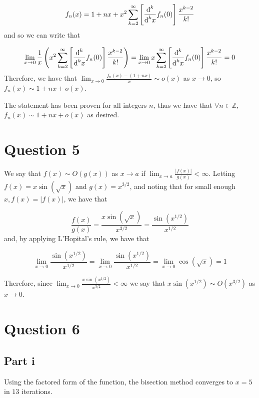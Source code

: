 \documentclass[12pt]{exam}
\newcommand{\diffd}{\textnormal{d}}
\begin{document}
\begin{equation}
f_n(x) = 1+nx+x^2\sum_{k=2}^{\infty} \left[\frac{\diffd^k}{\diffd^k x}f_n(0)\right] \frac{x^{k-2}}{k!}
\end{equation}
and so we can write that 

\begin{equation}
\lim_{x\rightarrow 0}\frac{1}{x} \left(x^2\sum_{k=2}^{\infty} \left[\frac{\diffd^k}{\diffd^k x}f_n(0)\right] \frac{x^{k-2}}{k!}\right) =
  \lim_{x\rightarrow 0} x\sum_{k=2}^{\infty} \left[\frac{\diffd^k}{\diffd^k x}f_n(0)\right] \frac{x^{k-2}}{k!}=0 
\end{equation}
Therefore, we have that $\lim_{x\rightarrow 0} \frac{f_n(x)-(1+nx)}{x}\sim o(x)$ as $x\rightarrow 0$, so $f_n(x) \sim 1+nx+o(x)$.

The statement has been proven for all integers $n$, thus we have that $\forall n \in \mathbb{Z}$, $f_n(x) \sim 1+nx+o(x)$ as desired.
\newpage 

\section*{Question 5}

We say that $f(x) \sim O( g(x) )$ as $x\rightarrow a$  if $\lim_{x\rightarrow a}\frac{|f(x)|}{g(x)} < \infty$. Letting $f(x)=x\sin(\sqrt{x})$ and $g(x) = x^{3/2}$, and noting that for small enough $x, f(x) = |f(x)|$, we have that 

\begin{equation}
\frac{f(x)}{g(x)} = \frac{x\sin(\sqrt{x})}{x^{3/2}} = \frac{\sin(x^{1/2})}{x^{1/2}}
\end{equation}
and, by applying L'Hopital's rule, we have that 

\begin{equation}
\lim_{x\rightarrow 0}  \frac{\sin(x^{1/2})}{x^{1/2}} = \lim_{x\rightarrow 0}  \frac{\sin(x^{1/2})}{x^{1/2}} = \lim_{x\rightarrow 0} \cos( \sqrt{x} ) = 1
\end{equation}

Therefore, since $\lim_{x\rightarrow 0}\frac{x\sin(x^{1/2})}{x^{3/2}} < \infty$ we say that $x\sin(x^{1/2}) \sim O( x^{3/2} )$ as $x\rightarrow 0$.

\newpage 

\section*{Question 6}

\subsection*{Part i}
Using the factored form of the function, the bisection method converges to $x=5$ in $13$ iterations. 
\end{document}
